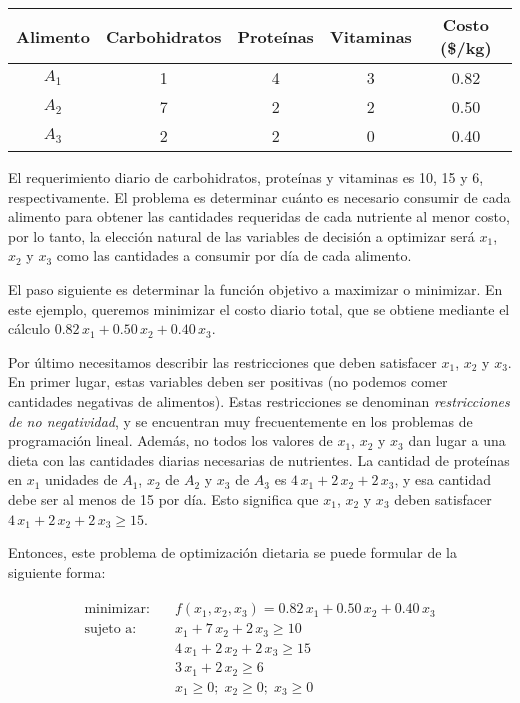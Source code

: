 \begin{center}
\begin{tabular}{ccccc}
\toprule
 Alimento & Carbohidratos & Proteínas & Vitaminas & Costo (\$/kg) \\
 \midrule
 $A_1$ & 1 & 4 & 3 & 0.82 \\
 $A_2$ & 7 & 2 & 2 & 0.50 \\
 $A_3$ & 2 & 2 & 0 & 0.40 \\
 \bottomrule
\end{tabular}
\end{center}

El requerimiento diario de carbohidratos, proteínas y vitaminas es 10, 15 y 6, respectivamente. El problema es determinar cuánto es necesario consumir de cada alimento para obtener las cantidades requeridas de cada nutriente al menor costo, por lo tanto, la elección natural de las variables de decisión a optimizar será $x_1$, $x_2$ y $x_3$ como las cantidades a consumir por día de cada alimento.

El paso siguiente es determinar la función objetivo a maximizar o minimizar. En este ejemplo, queremos minimizar el costo diario total, que se obtiene mediante el cálculo $0.82 \, x_1 + 0.50 \, x_2 + 0.40  \, x_3$.

Por último necesitamos describir las restricciones que deben satisfacer $x_1$, $x_2$ y $x_3$. En primer lugar, estas variables deben ser positivas (no podemos comer cantidades negativas de alimentos). Estas restricciones se denominan \textit{restricciones de no negatividad}, y se encuentran muy frecuentemente en los problemas de programación lineal. Además, no todos los valores de $x_1$, $x_2$ y $x_3$ dan lugar a una dieta con las cantidades diarias necesarias de nutrientes. La cantidad de proteínas en $x_1$ unidades de $A_1$, $x_2$ de $A_2$ y $x_3$ de $A_3$ es $4 \, x_1 + 2 \, x_2 + 2 \, x_3$, y esa cantidad debe ser al menos de 15 por día. Esto significa que $x_1$, $x_2$ y $x_3$ deben satisfacer $4 \, x_1 + 2 \, x_2 + 2 \, x_3 \geq 15$.

Entonces, este problema de optimización dietaria se puede formular de la siguiente forma:

\begin{align}
 \begin{split}
 \text{minimizar:}& \quad f(x_1, x_2, x_3) = 0.82 \, x_1 + 0.50 \, x_2 + 0.40  \, x_3 \\
 \text{sujeto a:}& \quad x_1 + 7 \, x_2 + 2 \, x_3 \geq 10 \\
 & \quad  4 \, x_1 + 2 \, x_2 + 2 \, x_3 \geq 15 \\
 & \quad  3 \, x_1 + 2 \,  x_2 \geq 6 \\
 & \quad  x_1 \geq 0; \; x_2 \geq 0; \; x_3 \geq 0
 \end{split}
 \label{eq:opt03}
\end{align}

